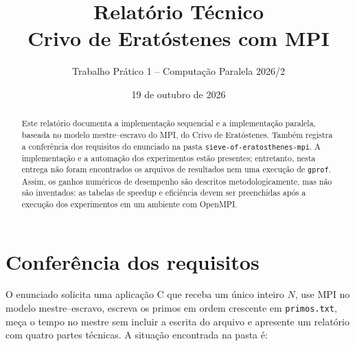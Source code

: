 \documentclass[12pt,a4paper]{article}
\title{Relatório Técnico\\Crivo de Eratóstenes com MPI}
\author{Trabalho Prático 1 -- Computação Paralela 2026/2}
\date{19 de outubro de 2026}
\begin{document}
\maketitle

\begin{abstract}
Este relatório documenta a implementação sequencial e a implementação
paralela, baseada no modelo mestre--escravo do MPI, do Crivo de Eratóstenes.
Também registra a conferência dos requisitos do enunciado na pasta
\texttt{sieve-of-eratosthenes-mpi}. A implementação e a automação dos
experimentos estão presentes; entretanto, nesta entrega não foram encontrados
os arquivos de resultados nem uma execução de \texttt{gprof}. Assim, os
ganhos numéricos de desempenho são descritos metodologicamente, mas não são
inventados: as tabelas de speedup e eficiência devem ser preenchidas após a
execução dos experimentos em um ambiente com OpenMPI.
\end{abstract}

\section{Conferência dos requisitos}

O enunciado solicita uma aplicação C que receba um único inteiro \(N\), use
MPI no modelo mestre--escravo, escreva os primos em ordem crescente em
\texttt{primos.txt}, meça o tempo no mestre sem incluir a escrita do arquivo e
apresente um relatório com quatro partes técnicas. A situação encontrada na
pasta é:
\end{document}
